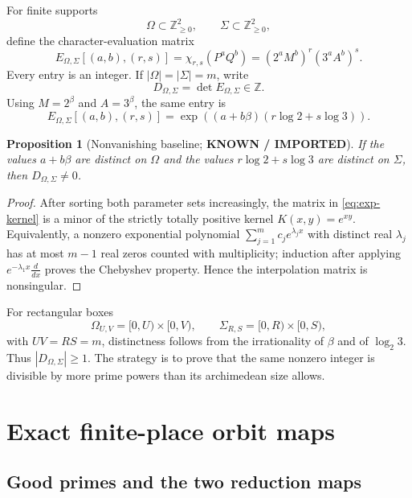 \documentclass[11pt]{article}
\newtheorem{proposition}[theorem]{Proposition}
\theoremstyle{definition}
\theoremstyle{remark}
\newcommand{\Z}{\mathbb Z}
\newcommand{\statusknown}{\textcolor{statusblue}{\textbf{KNOWN / IMPORTED}}}
\begin{document}
For finite supports
\[
\Omega\subset\Z_{\ge0}^2,\qquad \Sigma\subset\Z_{\ge0}^2,
\]
define the character-evaluation matrix
\begin{equation}\label{eq:evaluation-matrix}
E_{\Omega,\Sigma}[(a,b),(r,s)]
=\chi_{r,s}(P^aQ^b)
=(2^aM^b)^r(3^aA^b)^s.
\end{equation}
Every entry is an integer.  If $|\Omega|=|\Sigma|=m$, write
\[
D_{\Omega,\Sigma}=\det E_{\Omega,\Sigma}\in\Z.
\]
Using $M=2^\beta$ and $A=3^\beta$, the same entry is
\begin{equation}\label{eq:exp-kernel}
E_{\Omega,\Sigma}[(a,b),(r,s)]
=\exp\!\left((a+b\beta)(r\log2+s\log3)\right).
\end{equation}

\begin{proposition}[Nonvanishing baseline; \statusknown]\label{prop:nonvanishing}
If the values $a+b\beta$ are distinct on $\Omega$ and the values $r\log2+s\log3$ are distinct on $\Sigma$, then $D_{\Omega,\Sigma}\ne0$.
\end{proposition}

\begin{proof}
After sorting both parameter sets increasingly, the matrix in \eqref{eq:exp-kernel} is a minor of the strictly totally positive kernel $K(x,y)=e^{xy}$.  Equivalently, a nonzero exponential polynomial $\sum_{j=1}^m c_j e^{\lambda_j x}$ with distinct real $\lambda_j$ has at most $m-1$ real zeros counted with multiplicity; induction after applying $e^{-\lambda_1x}\frac{d}{dx}$ proves the Chebyshev property.  Hence the interpolation matrix is nonsingular.
\end{proof}

For rectangular boxes
\begin{equation}\label{eq:boxes}
\Omega_{U,V}=[0,U)\times[0,V),\qquad
\Sigma_{R,S}=[0,R)\times[0,S),
\end{equation}
with $UV=RS=m$, distinctness follows from the irrationality of $\beta$ and of $\log_2 3$.  Thus $|D_{\Omega,
\Sigma}|\ge1$.  The strategy is to prove that the same nonzero integer is divisible by more prime powers than its archimedean size allows.

\section{Exact finite-place orbit maps}

\subsection{Good primes and the two reduction maps}
\end{document}
